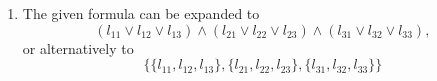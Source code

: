 \documentclass{article}
\begin{document}
\begin{enumerate}
    \item The given formula can be expanded to
    \begin{equation*}
        (l_{11} \lor l_{12} \lor l_{13}) \land (l_{21} \lor l_{22} \lor l_{23}) \land (l_{31} \lor l_{32} \lor l_{33}),
    \end{equation*}
    or alternatively to
    \begin{equation*}
        \{\{l_{11}, l_{12}, l_{13}\}, \{l_{21}, l_{22}, l_{23}\}, \{l_{31}, l_{32}, l_{33}\}\}
    \end{equation*}
\end{enumerate}
\end{document}
